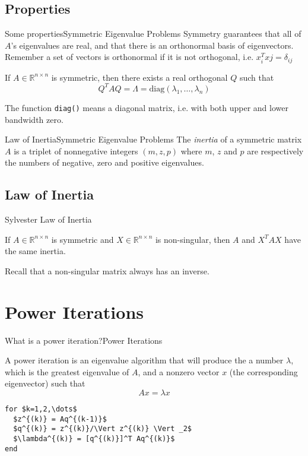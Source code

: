 \documentclass{beamer}
\begin{document}
\subsection{Properties}

\begin{frame}{Some properties}{Symmetric Eigenvalue Problems}
Symmetry guarantees that all of $A$'s eigenvalues are real, and that there is an orthonormal basis of eigenvectors.
\pause
Remember a set of vectors is orthonormal if it is not orthogonal, i.e. $x_i^T xj = \delta_{ij}$
\pause

\begin{theorem}
If $A \in \mathbb{R}^{n \times n}$ is symmetric, then there exists a real orthogonal $Q$ such that
\[Q^T A Q = \Lambda = \text{diag}(\lambda_1 , \dots , \lambda_n)\]
\end{theorem}

\pause

The function \texttt{diag()} means a diagonal matrix, i.e. with both upper and lower bandwidth zero.
\end{frame}

\begin{frame}{Law of Inertia}{Symmetric Eigenvalue Problems}
The \textit{inertia} of a symmetric matrix $A$ is a triplet of nonnegative integers $(m, z, p)$ where $m$, $z$ and $p$ are respectively the numbers of negative, zero and positive eigenvalues.
\pause

\subsection{Law of Inertia}

\begin{theorem}{Sylvester Law of Inertia}

If $A \in \mathbb{R}^{n \times n}$ is symmetric and $X \in \mathbb{R}^{n \times n}$ is non-singular, then $A$ and $X^T A X$ have the same inertia.
\end{theorem}
\pause
Recall that a non-singular matrix always has an inverse.
\end{frame}

\section{Power Iterations}

\begin{frame}[fragile]{What is a power iteration?}{Power Iterations}
\begin{definition}
A power iteration is an eigenvalue algorithm that will produce the a number $\lambda$, which is the greatest eigenvalue of $A$, and a nonzero vector $x$ (the corresponding eigenvector) such that
\[A x = \lambda x\]
\end{definition}
\pause
\begin{lstlisting}[mathescape=true]
for $k=1,2,\dots$
  $z^{(k)} = Aq^{(k-1)}$
  $q^{(k)} = z^{(k)}/\Vert z^{(k)} \Vert _2$
  $\lambda^{(k)} = [q^{(k)}]^T Aq^{(k)}$
end
\end{lstlisting}
\end{frame}
\end{document}

